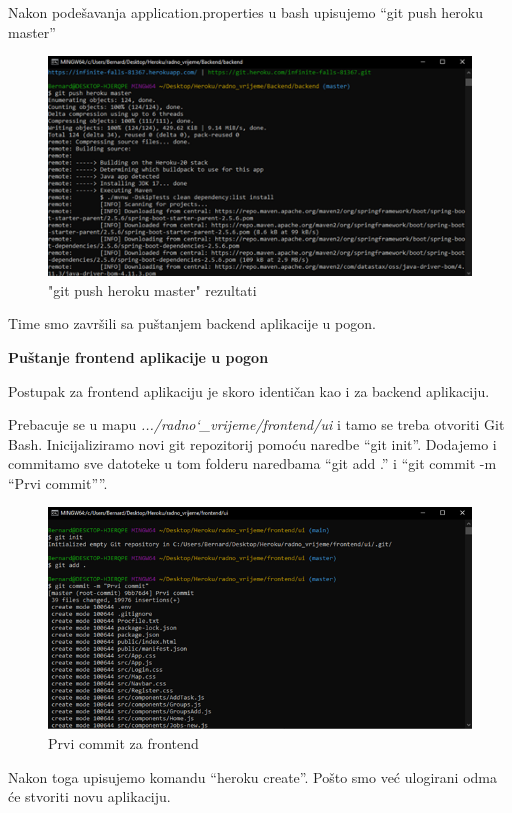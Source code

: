 Nakon podešavanja application.properties u bash upisujemo “git push heroku master” 
				\begin{figure}[H] 					\centering 					                \includegraphics[width=\textwidth]{Dokumentacija/pogon/Picture5.png}
				\caption{"git push heroku master" rezultati}
				\end{figure}
				Time smo završili sa puštanjem backend aplikacije u pogon. 

 

\textbf{Puštanje frontend aplikacije u pogon }

Postupak za frontend aplikaciju je skoro identičan kao i za backend aplikaciju. 

Prebacuje se u mapu \textit{.../radno\char`_vrijeme/frontend/ui} i tamo se treba otvoriti Git Bash. Inicijaliziramo novi git repozitorij pomoću naredbe “git init”. Dodajemo i commitamo sve datoteke u tom folderu naredbama “git add .” i “git commit -m “Prvi commit””.  

				\begin{figure}[H] 					\centering 					                \includegraphics[width=\textwidth]{Dokumentacija/pogon/Picture6.png}
				\caption{Prvi commit za frontend}
				\end{figure}
				Nakon toga upisujemo komandu “heroku create”. Pošto smo već ulogirani odma će stvoriti novu aplikaciju. 

